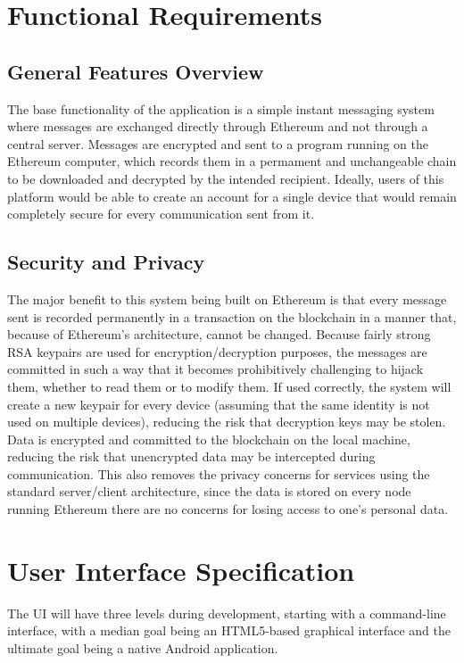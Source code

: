 \documentclass[titlepage]{report}
\begin{document}
\section{Functional Requirements}
\subsection{General Features Overview}
The base functionality of the application is a simple instant messaging system where messages are exchanged directly through \gls{Ethereum} and not through a central server. Messages are encrypted and sent to a program running on the Ethereum computer, which records them in a permament and unchangeable chain to be downloaded and decrypted by the intended recipient. Ideally, users of this platform would be able to create an account for a single device that would remain completely secure for every communication sent from it.

\subsection{Security and Privacy}
The major benefit to this system being built on Ethereum is that every message sent is recorded permanently in a transaction on the blockchain in a manner that, because of Ethereum's architecture, cannot be changed. Because fairly strong RSA keypairs are used for encryption/decryption purposes, the messages are committed in such a way that it becomes prohibitively challenging to hijack them, whether to read them or to modify them. If used correctly, the system will create a new keypair for every device (assuming that the same identity is not used on multiple devices), reducing the risk that decryption keys may be stolen. Data is encrypted and committed to the blockchain on the local machine, reducing the risk that unencrypted data may be intercepted during communication. This also removes the privacy concerns for services using the standard server/client architecture, since the data is stored on every node running Ethereum there are no concerns for losing access to one's personal data.

\section{User Interface Specification}
The UI will have three levels during development, starting with a command-line interface, with a median goal being an HTML5-based graphical interface and the ultimate goal being a native Android application.
\end{document}
